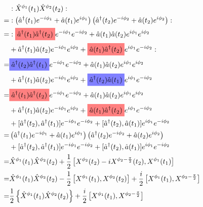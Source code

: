 \documentclass[12pt]{article}
\newcommand{\highlightr}[1]{%
  \colorbox{red!50}{$\displaystyle#1$}}
\newcommand{\highlightb}[1]{%
    \colorbox{blue!50}{$\displaystyle#1$}}
\begin{document}
\begin{align}
&:\hat{X}^{\phi_1}(t_1)\hat{X}^{\phi_2}(t_2):\\
=&:\left(\hat{a}^{\dag}(t_1)e^{-i\phi_1} + \hat{a}(t_1)e^{i \phi_1} \right)\left(\hat{a}^{\dag}(t_2)e^{-i\phi_2} + \hat{a}(t_2)e^{i \phi_2} \right) :\\
=&:\highlightr{\hat{a}^{\dag}(t_1)\hat{a}^{\dag}(t_2)}e^{-i\phi_1}e^{-i\phi_2} + \hat{a}(t_1)\hat{a}(t_2)e^{i\phi_1}e^{i\phi_2}\\
&+ \hat{a}^{\dag}(t_1)\hat{a}(t_2)e^{-i\phi_1}e^{i\phi_2} + \highlightr{\hat{a}(t_1)\hat{a}^{\dag}(t_2)}e^{i\phi_1}e^{-i\phi_2} :\\
=&\highlightb{\hat{a}^{\dag}(t_2)\hat{a}^{\dag}(t_1)}e^{-i\phi_1}e^{-i\phi_2} + \hat{a}(t_1)\hat{a}(t_2)e^{i\phi_1}e^{i\phi_2}\\
&+ \hat{a}^{\dag}(t_1)\hat{a}(t_2)e^{-i\phi_1}e^{i\phi_2} + \highlightb{\hat{a}^{\dag}(t_2)\hat{a}(t_1)}e^{i\phi_1}e^{-i\phi_2} \\
=&\highlightr{\hat{a}^{\dag}(t_1)\hat{a}^{\dag}(t_2)}e^{-i\phi_1}e^{-i\phi_2} + \hat{a}(t_1)\hat{a}(t_2)e^{i\phi_1}e^{i\phi_2}\\
&+ \hat{a}^{\dag}(t_1)\hat{a}(t_2)e^{-i\phi_1}e^{i\phi_2} + \highlightr{\hat{a}(t_1)\hat{a}^{\dag}(t_2)}e^{i\phi_1}e^{-i\phi_2} \\
&+ [\hat{a}^{\dag}(t_2),\hat{a}^{\dag}(t_1)] e^{-i\phi_1}e^{-i\phi_2} + [\hat{a}^{\dag}(t_2),\hat{a}(t_1)]e^{i\phi_1}e^{-i\phi_2}\\
=& \left(\hat{a}^{\dag}(t_1)e^{-i\phi_1} + \hat{a}(t_1)e^{i \phi_1} \right)\left(\hat{a}^{\dag}(t_2)e^{-i\phi_2} + \hat{a}(t_2)e^{i \phi_2} \right)\\
&+ [\hat{a}^{\dag}(t_2),\hat{a}^{\dag}(t_1)] e^{-i\phi_1}e^{-i\phi_2} + [\hat{a}^{\dag}(t_2),\hat{a}(t_1)]e^{i\phi_1}e^{-i\phi_2}\\
=& \hat{X}^{\phi_1}(t_1)\hat{X}^{\phi_2}(t_2) + \frac{1}{2}\left[X^{\phi_2}(t_2)-iX^{\phi_2-\frac{\pi}{2}}(t_2),X^{\phi_1}(t_1)\right]\\
=&  \hat{X}^{\phi_1}(t_1)\hat{X}^{\phi_2}(t_2) - \frac{1}{2}\left[X^{\phi_1}(t_1),X^{\phi_2}(t_2)\right] + \frac{i}{2}\left[X^{\phi_1}(t_1),X^{\phi_2-\frac{\pi}{2}}\right]\\
=& \frac{1}{2}\left\{\hat{X}^{\phi_1}(t_1)\hat{X}^{\phi_2}(t_2)\right\} + \frac{i}{2}\left[X^{\phi_1}(t_1),X^{\phi_2-\frac{\pi}{2}}\right]
\end{align}
\end{document}

